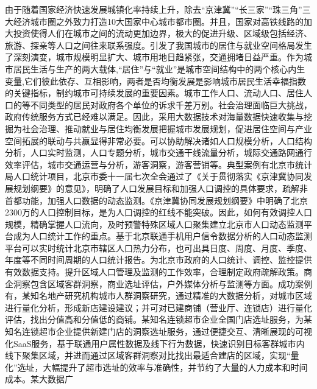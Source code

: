 由于随着国家经济快速发展城镇化率持续上升，除去“京津冀”“长三家”“珠三角”三大经济城市圈之外致力打造10大国家中心城市都市圈。并且，国家对高铁线路的加大投资使得人们在城市之间的流动更加边界，极大的促进升级、区域级包括经济、旅游、探亲等人口之间往来联系强度。引发了我国城市的居住与就业空间格局发生了深刻演变，城市规模明显扩大、城市用地日趋紧张，交通拥堵日益严重。作为城市居民生活与生产的两大载体,“居住”与“就业”是城市空间结构中的两个核心内生变量,它们彼此依存、互相影响，两者是否均衡发展是影响城市居民生活幸福指数的关键指标，制约城市可持续发展的重要因素。城市工作人口、流动人口、居住人口的等不同类型的居民对政府各个单位的诉求千差万别。社会治理面临巨大挑战，政府传统服务方式已经难以满足。因此，采用大数据技术对海量数据快速收集与挖掘为社会治理、推动就业与居住均衡发展把握城市发展规划，促进居住空间与产业空间拓展的联动与共赢显得非常必要。可以协助解决诸如人口规模分析，人口结构分析，人口实时监测，人口专题分析，城市交通干线流量分析，城际交通路网通行效率评估，城市交通运营与分析，游客洞察，游客营销等。典型案例有北京市统计局人口统计项目，北京市委十一届七次全会通过了《关于贯彻落实《京津冀协同发展规划纲要》的意见》，明确了人口发展目标和加强人口调控的具体要求，疏解非首都功能，加强人口数据的动态监测。《京津冀协同发展规划纲要》中明确了北京2300万的人口控制目标，是为人口调控的红线不能突破。因此，如何有效调控人口规模，精确掌握人口流向，及时预警特殊区域人口聚集建立北京市人口动态监测平台成为人口统计工作的重点。基于北京联通手机用户信令数据分析的人口动态监测平台可以实时统计北京市辖区人口热力分布，也可出具日度、周度、月度、季度、年度等不同时间周期的人口统计报告。为北京市政府的人口统计、调控、监控提供有效数据支持。提升区域人口管理及监测的工作效率，合理制定政府疏解政策。商企洞察包含区域客群洞察，商业选址评估，户外媒体分析与监测等方面。成功案例有，某知名地产研究机构城市人群洞察研究，通过精准的大数据分析，对城市区域进行量化分析，形成新店建设建议；并可对已建商铺（营业厅、连锁店）进行量化评估，找出分值高和分值低的商铺。某知名连锁超市企业全国门店选址服务，为某知名连锁超市企业提供新建门店的洞察选址服务，通过便捷交互、清晰展现的可视化SaaS服务，基于联通用户属性数据及线下行为数据，快速识别目标客群城市内线下聚集区域，并进而通过区域客群洞察对比找出最适合建店的区域，实现“量化”选址，大幅提升了超市选址的效率与准确性，并节约了大量的人力成本和时间成本。某大数据广